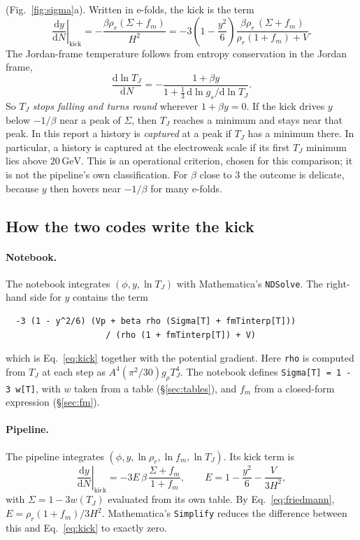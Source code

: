 \documentclass[11pt,a4paper]{article}
\newcommand{\TJ}{T_{J}}
\newcommand{\GeV}{\,\mathrm{GeV}}
\newcommand{\code}[1]{\texttt{#1}}
\begin{document}
(Fig.~\ref{fig:sigma}a). Written in e-folds, the kick is the term
\begin{equation}
  \left.\frac{\mathrm{d}y}{\mathrm{d}N}\right|_{\text{kick}}
  = -\frac{\beta\rho_r(\Sigma + f_m)}{H^2}
  = -3\left(1 - \frac{y^2}{6}\right)\frac{\beta\rho_r\,(\Sigma + f_m)}{\rho_r(1+f_m) + V}.
  \label{eq:kick}
\end{equation}
The Jordan-frame temperature follows from entropy conservation in the Jordan frame,
\begin{equation}
  \frac{\mathrm{d}\ln\TJ}{\mathrm{d}N} = -\frac{1 + \beta y}{1 + \tfrac13\,\mathrm{d}\ln g_s/\mathrm{d}\ln\TJ}.
  \label{eq:TJ}
\end{equation}
So $\TJ$ \emph{stops falling and turns round} wherever $1 + \beta y = 0$. If the kick drives
$y$ below $-1/\beta$ near a peak of $\Sigma$, then $\TJ$ reaches a minimum and stays near
that peak. In this report a history is \emph{captured} at a peak if $\TJ$ has a minimum
there. In particular, a history is captured at the electroweak scale if its first $\TJ$
minimum lies above $20\GeV$. This is an operational criterion, chosen for this comparison;
it is not the pipeline's own classification. For $\beta$ close to $3$ the outcome is
delicate, because $y$ then hovers near $-1/\beta$ for many e-folds.

\subsection{How the two codes write the kick}

\paragraph{Notebook.}
The notebook integrates $(\phi, y, \ln\TJ)$ with Mathematica's \code{NDSolve}. The right-hand
side for $y$ contains the term
\begin{verbatim}
  -3 (1 - y^2/6) (Vp + beta rho (Sigma[T] + fmTinterp[T]))
                    / (rho (1 + fmTinterp[T]) + V)
\end{verbatim}
which is Eq.~\eqref{eq:kick} together with the potential gradient. Here \code{rho} is computed
from $\TJ$ at each step as $A^4(\pi^2/30)g_\rho\TJ^4$. The notebook defines
\code{Sigma[T] = 1 - 3 w[T]}, with $w$ taken from a table (\S\ref{sec:tables}), and $f_m$
from a closed-form expression (\S\ref{sec:fm}).

\paragraph{Pipeline.}
The pipeline integrates $(\phi, y, \ln\rho_r, \ln f_m, \ln\TJ)$. Its kick term is
\begin{equation}
  \left.\frac{\mathrm{d}y}{\mathrm{d}N}\right|_{\text{kick}}
  = -3E\,\beta\,\frac{\Sigma + f_m}{1 + f_m},
  \qquad
  E = 1 - \frac{y^2}{6} - \frac{V}{3H^2},
\end{equation}
with $\Sigma = 1 - 3w(\TJ)$ evaluated from its own table. By Eq.~\eqref{eq:friedmann},
$E = \rho_r(1+f_m)/3H^2$. Mathematica's \code{Simplify} reduces the difference between this
and Eq.~\eqref{eq:kick} to exactly zero.
\end{document}
